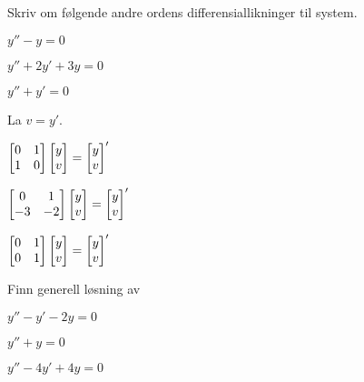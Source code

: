 
\begin{oppgave}
Skriv om følgende andre ordens differensiallikninger til system.

\begin{punkt}
$y''-y=0$
\end{punkt}

\begin{punkt}
	$y''+2y'+3y=0$
\end{punkt}

\begin{punkt}
	$y''+y'=0$
\end{punkt}


\end{oppgave}

\begin{losning} La $v=y'$.
	
	\begin{punkt}$\begin{bmatrix}
		0 & 1\\
		1 & 0
		\end{bmatrix} \begin{bmatrix} y \\ v \end{bmatrix}=\begin{bmatrix} y \\ v \end{bmatrix}'
		$
	\end{punkt}
	
	\begin{punkt}$\begin{bmatrix}
		0 & 1\\
		-3 & -2
		\end{bmatrix} \begin{bmatrix} y \\ v \end{bmatrix}=\begin{bmatrix} y \\ v \end{bmatrix}'
		$
	\end{punkt}
	
	\begin{punkt}$\begin{bmatrix}
		0 & 1\\
		0 & 1
		\end{bmatrix} \begin{bmatrix} y \\ v \end{bmatrix}=\begin{bmatrix} y \\ v \end{bmatrix}'
		$
	\end{punkt}
	
\end{losning}

\begin{oppgave}
Finn generell løsning av
\begin{punkt}
	$y''-y'-2y=0$
\end{punkt}

\begin{punkt}
	$y''+y=0$
\end{punkt}

\begin{punkt}
	$y''-4y'+4y=0$
\end{punkt}

\end{oppgave}

